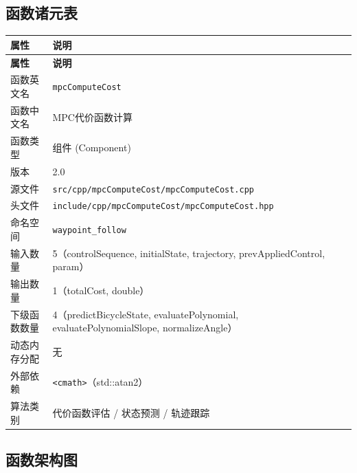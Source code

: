\documentclass[a4paper,10pt]{article}
\begin{document}
\subsection{函数诸元表}

\renewcommand{\arraystretch}{1.3}
\begin{longtable}{|L{3.8cm}|L{11.5cm}|}
\hline
\textbf{属性} & \textbf{说明} \\
\hline
\endfirsthead
\hline
\textbf{属性} & \textbf{说明} \\
\hline
\endhead
函数英文名 & \texttt{mpcComputeCost} \\
\hline
函数中文名 & MPC代价函数计算 \\
\hline
函数类型 & 组件 (Component) \\
\hline
版本 & 2.0 \\
\hline
源文件 & \texttt{src/cpp/mpcComputeCost/mpcComputeCost.cpp} \\
\hline
头文件 & \texttt{include/cpp/mpcComputeCost/mpcComputeCost.hpp} \\
\hline
命名空间 & \texttt{waypoint\_follow} \\
\hline
输入数量 & 5（controlSequence, initialState, trajectory, prevAppliedControl, param） \\
\hline
输出数量 & 1（totalCost, double） \\
\hline
下级函数数量 & 4（predictBicycleState, evaluatePolynomial, evaluatePolynomialSlope, normalizeAngle） \\
\hline
动态内存分配 & 无 \\
\hline
外部依赖 & \texttt{<cmath>}（std::atan2） \\
\hline
算法类别 & 代价函数评估 / 状态预测 / 轨迹跟踪 \\
\hline
\end{longtable}

\subsection{函数架构图}

\begin{center}
\end{center}
\end{document}
